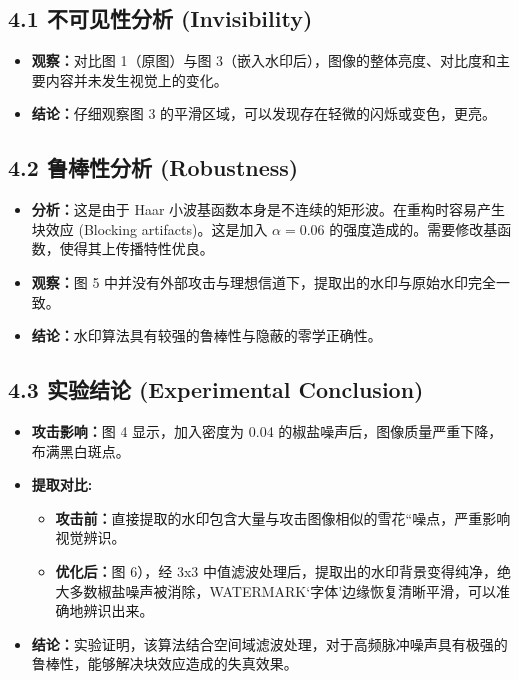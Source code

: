 \documentclass[12pt, a4paper]{article}
\begin{document}
\subsection*{4.1 不可见性分析 (Invisibility)}
\begin{itemize}
    \item \textbf{观察：}对比图 1（原图）与图 3（嵌入水印后），图像的整体亮度、对比度和主要内容并未发生视觉上的变化。
    \item \textbf{结论：}仔细观察图 3 的平滑区域，可以发现存在轻微的闪烁或变色，更亮。
\end{itemize}

\subsection*{4.2 鲁棒性分析 (Robustness)}
\begin{itemize}
    \item \textbf{分析：}这是由于 Haar 小波基函数本身是不连续的矩形波。在重构时容易产生块效应 (Blocking artifacts)。这是加入 $\alpha=0.06$ 的强度造成的。需要修改基函数，使得其上传播特性优良。
    \item \textbf{观察：}图 5 中并没有外部攻击与理想信道下，提取出的水印与原始水印完全一致。
    \item \textbf{结论：}水印算法具有较强的鲁棒性与隐蔽的零学正确性。
\end{itemize}

\subsection*{4.3 实验结论 (Experimental Conclusion)}
\begin{itemize}
    \item \textbf{攻击影响：}图 4 显示，加入密度为 0.04 的椒盐噪声后，图像质量严重下降，布满黑白斑点。
    \item \textbf{提取对比:}
    \begin{itemize} %
        \item \textbf{攻击前：}直接提取的水印包含大量与攻击图像相似的雪花“噪点，严重影响视觉辨识。
        \item \textbf{优化后：}图 6），经 3x3 中值滤波处理后，提取出的水印背景变得纯净，绝大多数椒盐噪声被消除，WATERMARK‘字体’边缘恢复清晰平滑，可以准确地辨识出来。
    \end{itemize}
    \item \textbf{结论：}实验证明，该算法结合空间域滤波处理，对于高频脉冲噪声具有极强的鲁棒性，能够解决块效应造成的失真效果。
\end{itemize}
\end{document}
